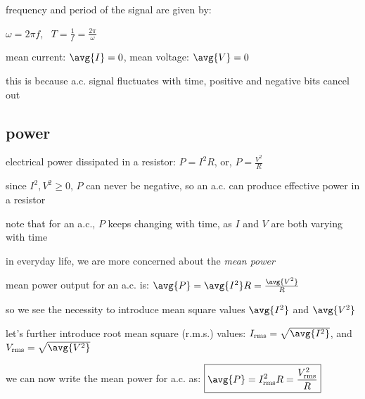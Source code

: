 frequency and period of the signal are given by:

{

\centering

$\omega = 2 \pi f$, $\,$ $T = \frac{1}{f} = \frac{2\pi}{\omega} $

}

\cmt mean current: $\avg{I} = 0$, mean voltage: $\avg{V}=0$

this is because a.c. signal fluctuates with time, positive and negative bits cancel out

\newpage







\subsection{power}

electrical power dissipated in a resistor: $P = I^2 R$, or, $P=\frac{V^2}{R}$

since $I^2, V^2 \geq 0$, $P$ can never be negative, so an a.c. can produce effective power in a resistor

note that for an a.c., $P$ keeps changing with time, as $I$ and $V$ are both varying with time

in everyday life, we are more concerned about the \emph{mean power}

mean power output for an a.c. is: $\avg{P} = \avg{I^2} R = \frac{\avg{V^2}}{R}$

so we see the necessity to introduce mean square values $\avg{I^2}$  and $\avg{V^2}$

let's further introduce root mean square (r.m.s.) values: $I_\text{rms} = \sqrt{\avg{I^2}}$, and $V_\text{rms} = \sqrt{\avg{V^2}}$

we can now write the mean power for a.c. as: $\boxed{\avg{P} = I^2_\text{rms} R = \frac{V^2_\text{rms}}{R}}$

